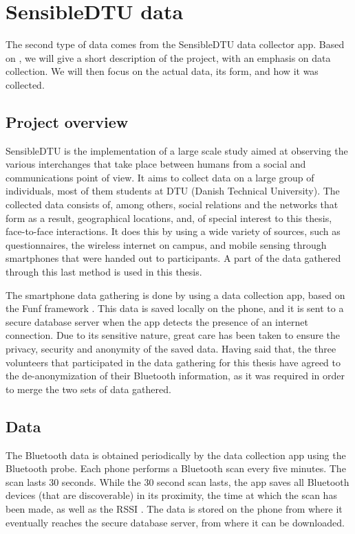 \section{SensibleDTU data}

 The second type of data comes from the SensibleDTU data collector app. Based on \cite{Stopczynski,sensibledtu}, we will give a short description of the project, with an emphasis on data collection. We will then focus on the actual data, its form, and how it was collected. 

\subsection{Project overview}
 
 SensibleDTU is the implementation of a large scale study aimed at observing the various interchanges that take place between humans from a social and communications point of view. It aims to collect data on a large group of individuals, most of them students at DTU (Danish Technical University). The collected data consists of, among others, social relations and the networks that form as a result, geographical locations, and, of special interest to this thesis, face-to-face interactions. It does this by using a wide variety of sources, such as questionnaires, the wireless internet on campus, and mobile sensing through smartphones that were handed out to participants. A part of the data gathered through this last method is used in this thesis.
 
The smartphone data gathering is done by using a data collection app, based on the Funf framework \cite{funf}. This data is saved locally on the phone, and it is sent to a secure database server when the app detects the presence of an internet connection. Due to its sensitive nature, great care has been taken to ensure the privacy, security and anonymity of the saved data. Having said that, the three volunteers that participated in the data gathering for this thesis have agreed to the de-anonymization of their Bluetooth information, as it was required in order to merge the two sets of data gathered. 
 
 
\subsection{Data} 

The Bluetooth data is obtained periodically by the data collection app using the Bluetooth probe. Each phone performs a Bluetooth scan every five minutes. The scan lasts 30 seconds. While the 30 second scan lasts, the app saves all Bluetooth devices (that are discoverable) in its proximity, the time at which the scan has been made, as well as the RSSI \cite{vedran}. The data is stored on the phone from where it eventually reaches the secure database server, from where it can be downloaded. 

